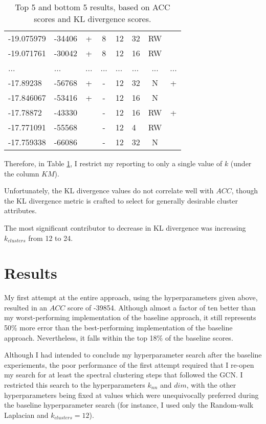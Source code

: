 \documentclass{article}
\begin{document}
\begin{table}[ht]
\begin{tabular}{|l|l|c|c|l|l|c|c}
    -19.075979 & -34406 & + & 8 & 12 & 32 & RW & \\
    -19.071761 & -30042 & + & 8 & 12 & 16 & RW & \\
    ... & ... & ... & ... & ... & ... & ... & ...\\
    -17.89238 & -56768 & + & - & 12 & 32 & N & +\\
    -17.846067 & -53416 & + & - & 12 & 16 & N & \\
    -17.78872 & -43330 &  & - & 12 & 16 & RW & +\\
    -17.771091 & -55568 &  & - & 12 & 4 & RW & \\
    -17.759338 & -66086 &  & - & 12 & 32 & N & \\
    \end{tabular}
    \caption{Top 5 and bottom 5 results, based on ACC scores and KL divergence scores. \label{tab:ress}}
\end{table}


Therefore, in Table \ref{tab:ress}, I restrict my reporting to only a single value of $k$ (under the column $KM$).



Unfortunately, the KL divergence values do not correlate well with $ACC$, though the KL divergence metric is crafted to select for generally desirable cluster attributes.

The most significant contributor to decrease in KL divergence was increasing $k_{clusters}$ from 12 to 24.

\section{Results}

My first attempt at the entire approach, using the hyperparameters given above, resulted in an $ACC$ score of -39854. Although almost a factor of ten better than my worst-performing implementation of the baseline approach, it still represents 50\% more error than the best-performing implementation of the baseline approach. Nevertheless, it falls within the top 18\% of the baseline scores.

Although I had intended to conclude my hyperparameter search after the baseline experiements, the poor performance of the first attempt required that I re-open my search for at least the spectral clustering steps that followed the GCN. I restricted this search to the hyperparameters $k_{nn}$ and $dim$, with the other hyperparameters being fixed at values which were unequivocally preferred during the baseline hyperparameter search (for instance, I used only the Random-walk Laplacian and $k_{clusters} = 12$).
\end{document}

